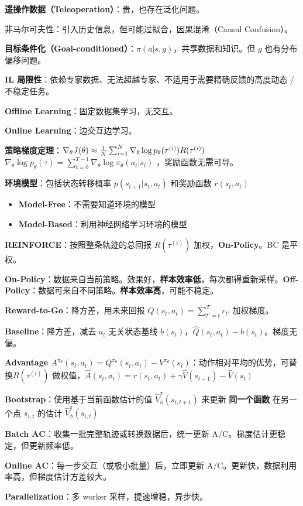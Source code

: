 \documentclass[
  8pt]{extarticle}
\providecommand{\tightlist}{%
  \setlength{\itemsep}{0pt}\setlength{\parskip}{0pt}}
\begin{document}
\begin{multicols*}{4}
\textbf{遥操作数据（Teleoperation）}：贵，也存在泛化问题。

非马尔可夫性：引入历史信息，但可能过拟合，因果混淆（Causal Confusion）。

\textbf{目标条件化（Goal-conditioned）}：\(\pi(a|s, g)\)，共享数据和知识。但
\(g\) 也有分布偏移问题。

\textbf{IL
局限性}：依赖专家数据、无法超越专家、不适用于需要精确反馈的高度动态 /
不稳定任务。

\textbf{Offline Learning}：固定数据集学习，无交互。

\textbf{Online Learning}：边交互边学习。

\textbf{策略梯度定理}：\(\nabla_\theta J(\theta) \approx \frac{1}{N} \sum_{i=1}^{N} \nabla_\theta \log p_\theta(\tau^{(i)}) R(\tau^{(i)})\\\)
\(\nabla_\theta \log p_\theta(\tau) = \sum_{t=0}^{T-1} \nabla_\theta \log \pi_\theta(a_t | s_t)\)
，奖励函数无需可导。

\textbf{环境模型}：包括状态转移概率 \(p(s_{t+1} | s_t, a_t)\) 和奖励函数
\(r(s_t, a_t)\)

\begin{itemize}
\tightlist
\item
  \textbf{Model-Free}：不需要知道环境的模型
\item
  \textbf{Model-Based}：利用神经网络学习环境的模型
\end{itemize}

\textbf{REINFORCE}：按照整条轨迹的总回报 \(R(\tau^{(i)})\)
加权，\textbf{On-Policy}。BC 是平权。

\textbf{On-Policy}：数据来自当前策略。效果好，\textbf{样本效率低}，每次都得重新采样。\textbf{Off-Policy}：数据可来自不同策略。\textbf{样本效率高}，可能不稳定。

\textbf{Reward-to-Go}：降方差，用未来回报
\(\hat{Q}(s_t, a_t) = \sum_{t'=t}^{T} r_{t'}\) 加权梯度。

\textbf{Baseline}：降方差，减去 \(a_t\) 无关状态基线
\(b(s_t)\)，\(\hat{Q}(s_t, a_t) - b(s_t)\)。梯度无偏。

\textbf{Advantage
\(A^{\pi_\theta}(s_t, a_t) = Q^{\pi_\theta}(s_t, a_t) - V^{\pi_\theta}(s_t)\)}：动作相对平均的优势，可替换\(R(\tau^{(i)})\)
做权值，\(\hat{A}(s_t, a_t) = r(s_t, a_t) + \gamma \hat{V}(s_{t+1}) - \hat{V}(s_t)\)

\textbf{Bootstrap}：使用基于当前函数估计的值
\(\hat{V}_{\phi}^{\pi}(s_{i,t+1})\) 来更新 \textbf{同一个函数}
在另一个点 \(s_{i,t}\) 的估计 \(\hat{V}_{\phi}^{\pi}(s_{i,t})\)

\textbf{Batch AC}：收集一批完整轨迹或转换数据后，统一更新
A/C。梯度估计更稳定，但更新频率低。

\textbf{Online AC}：每一步交互（或极小批量）后，立即更新
A/C。更新快，数据利用率高，但梯度估计方差较大。

\textbf{Parallelization}：多 worker 采样，提速增稳，异步快。

\end{multicols*}
\end{document}
